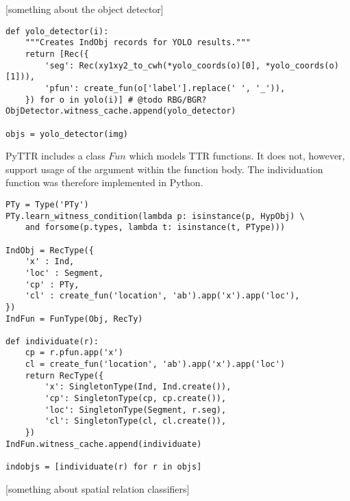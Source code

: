 [something about the object detector]

\begin{lstlisting}[label=lst:pyttr_yolo, caption=Connecting YOLO output to PyTTR]
def yolo_detector(i):
    """Creates IndObj records for YOLO results."""
    return [Rec({
        'seg': Rec(xy1xy2_to_cwh(*yolo_coords(o)[0], *yolo_coords(o)[1])),
        'pfun': create_fun(o['label'].replace(' ', '_')),
    }) for o in yolo(i)] # @todo RBG/BGR?
ObjDetector.witness_cache.append(yolo_detector)

objs = yolo_detector(img)
\end{lstlisting}

PyTTR includes a class $Fun$ which models TTR functions.
It does not, however, support usage of the argument within the function body.
The individuation function was therefore implemented in Python.

\begin{lstlisting}[label={lst:individuate},caption={individuate()}]
PTy = Type('PTy')
PTy.learn_witness_condition(lambda p: isinstance(p, HypObj) \
    and forsome(p.types, lambda t: isinstance(t, PType)))

IndObj = RecType({
    'x' : Ind,
    'loc' : Segment,
    'cp' : PTy,
    'cl' : create_fun('location', 'ab').app('x').app('loc'),
})
IndFun = FunType(Obj, RecTy)

def individuate(r):
    cp = r.pfun.app('x')
    cl = create_fun('location', 'ab').app('x').app('loc')
    return RecType({
        'x': SingletonType(Ind, Ind.create()),
        'cp': SingletonType(cp, cp.create()),
        'loc': SingletonType(Segment, r.seg),
        'cl': SingletonType(cl, cl.create()),
    })
IndFun.witness_cache.append(individuate)

indobjs = [individuate(r) for r in objs]
\end{lstlisting}

[something about spatial relation classifiers]

